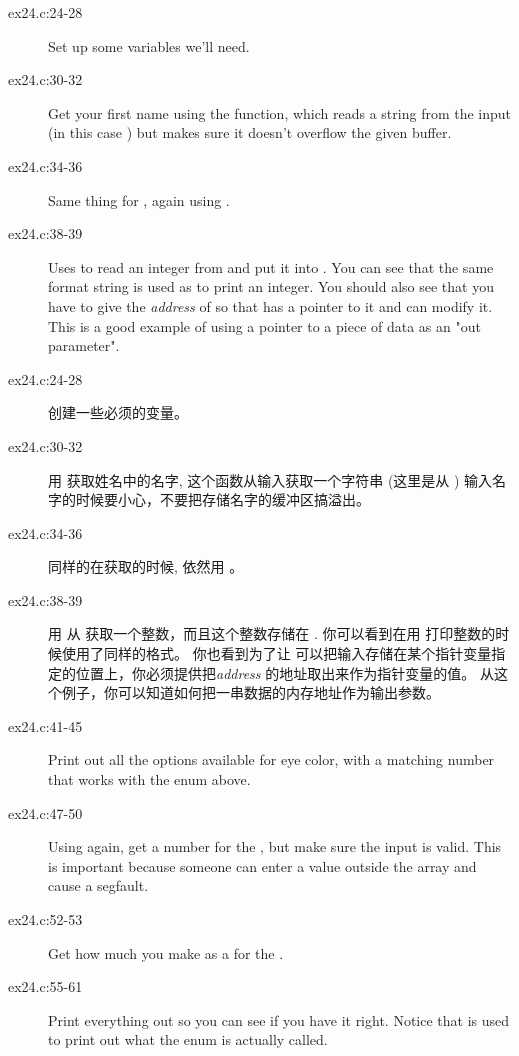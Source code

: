 \begin{description}
\item[ex24.c:24-28] Set up some variables we'll need.
\item[ex24.c:30-32] Get your first name using the  function, which reads a
    string from the input (in this case ) but makes sure it
    doesn't overflow the given buffer.
\item[ex24.c:34-36] Same thing for , again using .
\item[ex24.c:38-39] Uses  to read an integer from  and put it
    into .  You can see that the same format string is used
    as  to print an integer.  You should also see that you have
    to give the \emph{address} of  so that  has
    a pointer to it and can modify it.  This is a good example of using a
    pointer to a piece of data as an "out parameter".
\item[ex24.c:24-28] 创建一些必须的变量。
\item[ex24.c:30-32] 用 获取姓名中的名字, 这个函数从输入获取一个字符串
    (这里是从 ) 输入名字的时候要小心，不要把存储名字的缓冲区搞溢出。
\item[ex24.c:34-36] 同样的在获取的时候, 依然用 。
\item[ex24.c:38-39] 用 从 获取一个整数，而且这个整数存储在
    .  你可以看到在用 打印整数的时候使用了同样的格式。
    你也看到为了让  可以把输入存储在某个指针变量指定的位置上，你必须提供把\emph{address} 的地址取出来作为指针变量的值。 从这个例子，你可以知道如何把一串数据的内存地址作为输出参数。
\item[ex24.c:41-45] Print out all the options available for eye color, with a matching
    number that works with the  enum above.
\item[ex24.c:47-50] Using  again, get a number for the , 
    but make sure the input is valid.  This is important because someone can
    enter a value outside the  array and cause a 
    segfault.
\item[ex24.c:52-53] Get how much you make as a  for the .
\item[ex24.c:55-61] Print everything out so you can see if you have it right.  Notice
    that  is used to print out what the 
    enum is actually called.
\end{description}


